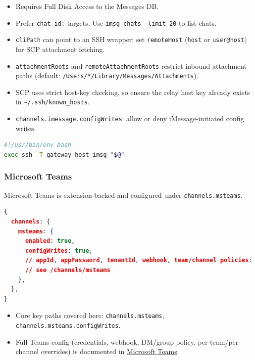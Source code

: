 \begin{itemize}
  \item Requires Full Disk Access to the Messages DB.
  \item Prefer \texttt{chat\_id:} targets. Use \texttt{imsg chats --limit 20} to list chats.
  \item \texttt{cliPath} can point to an SSH wrapper; set \texttt{remoteHost} (\texttt{host} or \texttt{user@host}) for SCP attachment fetching.
  \item \texttt{attachmentRoots} and \texttt{remoteAttachmentRoots} restrict inbound attachment paths (default: \texttt{/Users/*/Library/Messages/Attachments}).
  \item SCP uses strict host-key checking, so ensure the relay host key already exists in \texttt{\textasciitilde{}/.ssh/known\_hosts}.
  \item \texttt{channels.imessage.configWrites}: allow or deny iMessage-initiated config writes.
\end{itemize}



\begin{lstlisting}[language=bash]
#!/usr/bin/env bash
exec ssh -T gateway-host imsg "$@"
\end{lstlisting}



\subsubsection{Microsoft Teams}


Microsoft Teams is extension-backed and configured under \texttt{channels.msteams}.

\begin{lstlisting}[language=json]
{
  channels: {
    msteams: {
      enabled: true,
      configWrites: true,
      // appId, appPassword, tenantId, webhook, team/channel policies:
      // see /channels/msteams
    },
  },
}
\end{lstlisting}


\begin{itemize}
  \item Core key paths covered here: \texttt{channels.msteams}, \texttt{channels.msteams.configWrites}.
  \item Full Teams config (credentials, webhook, DM/group policy, per-team/per-channel overrides) is documented in \href{/channels/msteams}{Microsoft Teams}.
\end{itemize}


